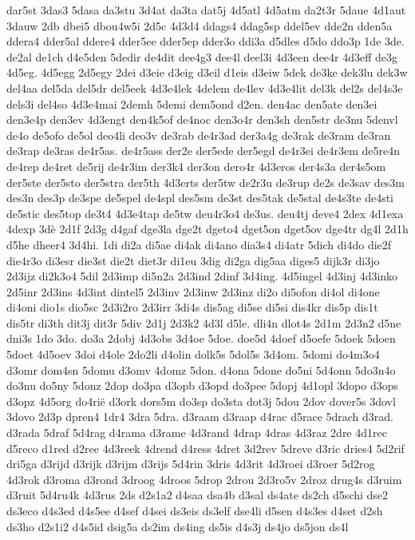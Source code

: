 {dar5st
3das3
5dasa
da3stu
3d4at
da3ta
dat5j
4d5atl
4d5atm
da2t3r
5daue
4d1aut
3dauw
2db
dbei5
dbou4w5i
2d5c
4d3d4
ddags4
ddag5sp
ddel5ev
dde2n
dden5a
ddera4
dder5al
ddere4
dder5ee
dder5ep
dder3o
ddi3a
d5dles
d5do
ddo3p
1de
3de.
de2al
de1ch
d4e5den
5dedir
de4dit
dee4g3
dee4l
deel3i
4d3een
dee4r
4d3eff
de3g
4d5eg.
4d5egg
2d5egy
2dei
d3eie
d3eig
d3eil
d1eis
d3eiw
5dek
de3ke
dek3lu
dek3w
del4aa
del5da
del5dr
del5eek
4d3e4lek
4delem
de4lev
4d3e4lit
del3k
del2s
del4s3e
dels3i
del4so
4d3e4mai
2demh
5demi
dem5ond
d2en.
den4ac
den5ate
den3ei
den3e4p
den3ev
4d3engt
den4k5of
de4noc
den3o4r
den3sh
den5str
de3nu
5denvl
de4o
de5ofo
de5ol
deo4li
deo3v
de3rab
de4r3ad
der3a4g
de3rak
de3ram
de3ran
de3rap
de3ras
de4r5as.
de4r5ass
der2e
der5ede
der5egd
de4r3ei
de4r3em
de5re4n
de4rep
de4ret
de5rij
de4r3im
der3k4
der3on
dero4r
4d3eros
der4s3a
der4s5om
der5ste
der5sto
der5stra
der5th
4d3erts
der5tw
de2r3u
de3rup
de2s
de3sav
des3m
des3n
des3p
de3spe
de5spel
de4spl
des5sm
de3st
des5tak
de5stal
de4s3te
de4sti
de5stic
des5top
de3t4
4d3e4tap
de5tw
deu4r3o4
de3us.
deu4tj
deve4
2dex
4d1exa
4dexp
3dè
2d1f
2d3g
d4gaf
dge3la
dge2t
dgeto4
dget5on
dget5ov
dge4tr
dg4l
2d1h
d5he
dheer4
3d4hi.
1di
di2a
di5ae
di4ak
di4ano
dia3s4
di4atr
5dich
di4do
die2f
die4r3o
di3esr
die3st
die2t
diet3r
di1eu
3dig
di2ga
dig5aa
diges5
dijk3r
di3jo
2d3ijz
di2k3o4
5dil
2d3imp
di5n2a
2d3ind
2dinf
3d4ing.
4d5ingel
4d3inj
4d3inko
2d5inr
2d3ins
4d3int
dintel5
2d3inv
2d3inw
2d3inz
di2o
di5ofon
di4ol
di4one
di4oni
dio1s
dio5sc
2d3i2ro
2d3irr
3di4s
dis5ag
di5se
di5si
dis4kr
dis5p
dis1t
dis5tr
di3th
dit3j
dit3r
5div
2d1j
2d3k2
4d3l
d5le.
dli4n
dlot4s
2d1m
2d3n2
d5ne
dni3s
1do
3do.
do3a
2dobj
4d3obs
3d4oe
5doe.
doe5d
4doef
d5oefe
5doek
5doen
5doet
4d5oev
3doi
d4ole
2do2li
d4olin
dolk5s
5dol5s
3d4om.
5domi
do4m3o4
d3omr
dom4sn
5domu
d3omv
4domz
5don.
d4ona
5done
do5ni
5d4onn
5do3n4o
do3nu
do5ny
5donz
2dop
do3pa
d3opb
d3opd
do3pee
5dopj
4d1opl
3dopo
d3ops
d3opz
4d5org
do4rië
d3ork
dors5m
do3sp
do3sta
dot3j
5dou
2dov
dover5s
3dovl
3dovo
2d3p
dpren4
1dr4
3dra
5dra.
d3raam
d3raap
d4rac
d5race
5drach
d3rad.
d3rada
5draf
5d4rag
d4rama
d3rame
4d3rand
4drap
4dras
4d3raz
2dre
4d1rec
d5reco
d1red
d2ree
4d3reek
4drend
d4ress
4dret
3d2rev
5dreve
d3ric
dries4
5d2rif
dri5ga
d3rijd
d3rijk
d3rijm
d3rijs
5d4rin
3dris
4d3rit
4d3roei
d3roer
5d2rog
4d3rok
d3roma
d3rond
3droog
4droos
5drop
2drou
2d3ro5v
2droz
drug4s
d3ruim
d3ruit
5d4ru4k
4d3rus
2ds
d2s1a2
d4saa
dsa4b
d3sal
ds4ate
ds2ch
d5schi
dse2
ds3eco
d4s3ed
d4s5ee
d4sef
d4sei
ds3eis
ds3elf
dse4li
d5sen
d4s3es
d4set
d2sh
ds3ho
d2s1i2
d4s5id
dsig5a
ds2im
ds4ing
ds5is
d4s3j
ds4jo
ds5jon
ds4l
}
